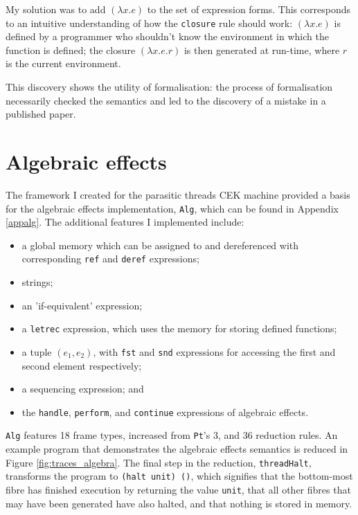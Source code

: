 \documentclass[12pt,a4paper,twoside,openright]{report}
\begin{document}
My solution was to add $(\lambda x.e)$ to the set of expression forms. This corresponds to an intuitive understanding of how the \texttt{closure} rule should work: $(\lambda x.e)$ is defined by a programmer who shouldn't know the environment in which the function is defined; the closure $(\lambda x.e.r)$ is then generated at run-time, where $r$ is the current environment.

This discovery shows the utility of formalisation: the process of formalisation necessarily checked the semantics and led to the discovery of a mistake in a published paper.

\section{Algebraic effects}\label{impllast}

The framework I created for the parasitic threads CEK machine provided a basis for the algebraic effects implementation, \texttt{Alg}, which can be found in Appendix \ref{appalg}. The additional features I implemented include:

\begin{itemize}
\item a global memory which can be assigned to and dereferenced with corresponding \texttt{ref} and \texttt{deref} expressions;
\item strings;
\item an 'if-equivalent' expression;
\item a \texttt{letrec} expression, which uses the memory for storing defined functions;
\item a tuple $(e_1, e_2)$, with \texttt{fst} and \texttt{snd} expressions for accessing the first and second element respectively;
\item a sequencing expression; and
\item the \texttt{handle}, \texttt{perform}, and \texttt{continue} expressions of algebraic effects.
\end{itemize}

\texttt{Alg} features 18 frame types, increased from \texttt{Pt}'s 3, and 36 reduction rules. An example program that demonstrates the algebraic effects semantics is reduced in Figure \ref{fig:traces_algebra}. The final step in the reduction, \texttt{threadHalt}, transforms the program to \texttt{(halt unit) ()}, which signifies that the bottom-most fibre has finished execution by returning the value \texttt{unit}, that all other fibres that may have been generated have also halted, and that nothing is stored in memory.
\end{document}
